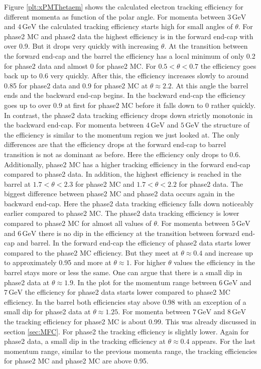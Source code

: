 \documentclass[a4paper,11pt,twosided,final,german,openbib,pdftex,listof=totoc,bibliography=totoc]{scrbook}
\begin{document}
Figure \ref{plt:xPMThetaem} shows the calculated electron tracking efficiency for different momenta as function of the polar angle. For momenta between $3\,\textrm{GeV}$ and $4\,\textrm{GeV}$ the calculated tracking efficiency starts high for small angles of $\theta$. For phase2 MC and phase2 data the highest efficiency is in the forward end-cap with over 0.9. But it drops very quickly with increasing $\theta$. At the transition between the forward end-cap and the barrel the efficiency has a local minimum of only 0.2 for phase2 data and almost 0 for phase2 MC.
For $0.5 < \theta < 0.7$ the efficiency goes back up to 0.6 very quickly. After this, the efficiency increases slowly to around 0.85 for phase2 data and 0.9 for phase2 MC at $\theta \approx 2.2$. At this angle the barrel ends and the backward end-cap begins. 
In the backward end-cap the efficiency goes up to over 0.9 at first for phase2 MC before it falls down to 0 rather quickly. In contrast, the phase2 data tracking efficiency drops down strictly monotonic in the backward end-cap. 
For momenta between $4\,\textrm{GeV}$ and $5\,\textrm{GeV}$ the structure of the efficiency is similar to the momentum region we just looked at. The only differences are that the efficiency drops at the forward end-cap to barrel transition is not as dominant as before. Here the efficiency only drops to 0.6. Additionally, phase2 MC has a higher tracking efficiency in the forward end-cap compared to phase2 data.
In addition, the highest efficiency is reached in the barrel at $1.7< \theta <2.3$ for phase2 MC and $1.7< \theta <2.2$ for phase2 data. The biggest difference between phase2 MC and phase2 data occurs again in the backward end-cap. Here the phase2 data tracking efficiency falls down noticeably earlier compared to phase2 MC. The phase2 data tracking efficiency is lower compared to phase2 MC for almost all values of $\theta$.
For momenta between $5\,\textrm{GeV}$ and $6\,\textrm{GeV}$ there is no dip in the efficiency at the transition between forward end-cap and barrel. In the forward end-cap the efficiency of phase2 data starts lower compared to the phase2 MC efficiency. But they meet at $\theta \approx 0.4$  and increase up to approximately 0.95 and more at $\theta \approx 1$.
For higher $\theta$ values the efficiency in the barrel stays more or less the same. One can argue that there is a small dip in phase2 data at $\theta \approx 1.9$.
In the plot for the momentum range between $6\,\textrm{GeV}$ and $7\,\textrm{GeV}$ the efficiency for phase2 data starts lower compared to phase2 MC efficiency. In the barrel both efficiencies stay above 0.98 with an exception of a small dip for phase2 data at $\theta \approx 1.25$. 
For momenta  between $7\,\textrm{GeV}$ and $8\,\textrm{GeV}$ the tracking efficiency for phase2 MC is about 0.99. This was already discussed in section \ref{sec:MFC}. For phase2 the tracking efficiency is slightly lower. Again for phase2 data, a small dip in the tracking efficiency at $\theta \approx 0.4$ appears. 
For the last momentum range, similar to the previous momenta range, the tracking efficiencies for phase2 MC and phase2 MC are above 0.95.
 
\end{document}
